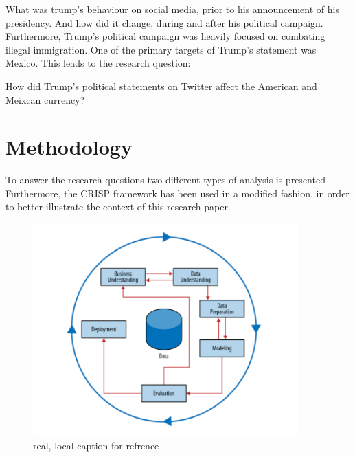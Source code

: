 \documentclass{article}
\begin{document}
\par\vspace{10pt}

What was trump's behaviour on social media, prior to his announcement of his presidency. And how did it change, during and after his political campaign.\\

Furthermore, Trump's political campaign was heavily focused on combating illegal immigration. One of the primary targets of Trump's statement was Mexico.
This leads to the research question:

How did Trump's political statements on Twitter affect the American and Meixcan currency?





\section{Methodology}
To answer the research questions two different types of analysis is presented\\


Furthermore,  the CRISP framework has been used in a modified fashion, in order to better illustrate the context of this research paper.\\

\begin{figure}[H] %
	\centering %
\includegraphics [scale= .95]  {CRISP.PNG}    %
	\caption[Optional caption] {real, local caption for refrence}
	\label{fig:wordcloudBliz}

\end{figure}
\end{document}
